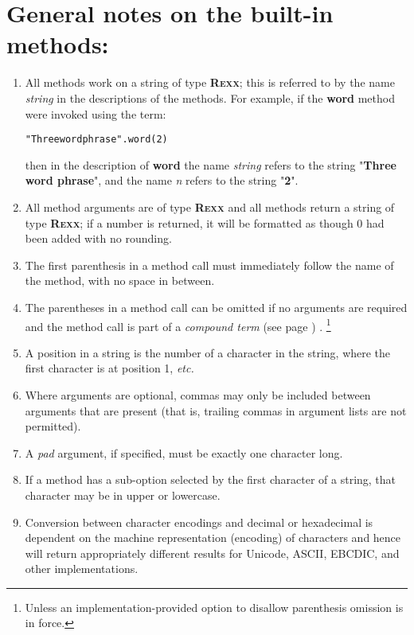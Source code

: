 \section{General notes on the built-in methods:}
\begin{enumerate}
\item All methods work on a \nr{} string of type \textbf{R\textsc{exx}}; this
is referred to by the name \emph{string} in the descriptions of the
methods.  For example, if the \textbf{word} method were invoked using
the term:
\begin{alltt}
"Three word phrase".word(2)
\end{alltt}
then in the description of \textbf{word} the name
\emph{string} refers to the string "\textbf{Three word
phrase}", and the name \emph{n} refers to the string
"\textbf{2}".
\item All method arguments are of type \textbf{R\textsc{exx}} and all methods
return a string of type \textbf{R\textsc{exx}}; if a number is returned, it
will be formatted as though 0 had been added with no rounding.
\item 
The first parenthesis in a method call must immediately follow the name
of the method, with no space in between.
\item The parentheses in a method call can be omitted if no
arguments are required and the method call is part of a
 \emph{compound term} (see page \pageref{refcomterm}) .
\footnote{
Unless an implementation-provided option to disallow parenthesis
omission is in force.
}
\item A position in a string is the number of a character in the string,
where the first character is at position 1, \emph{etc.}
\item Where arguments are optional, commas may only be included between
arguments that are present (that is, trailing commas in argument lists
are not permitted).
\item A \emph{pad} argument, if specified, must be exactly one
character long.
\item If a method has a sub-option selected by the first character of a
string, that character may be in upper or lowercase.
\item Conversion between character encodings and decimal or hexadecimal
is dependent on the machine representation (encoding) of characters
and hence will return appropriately different results for Unicode,
ASCII, EBCDIC, and other implementations.
\end{enumerate}
